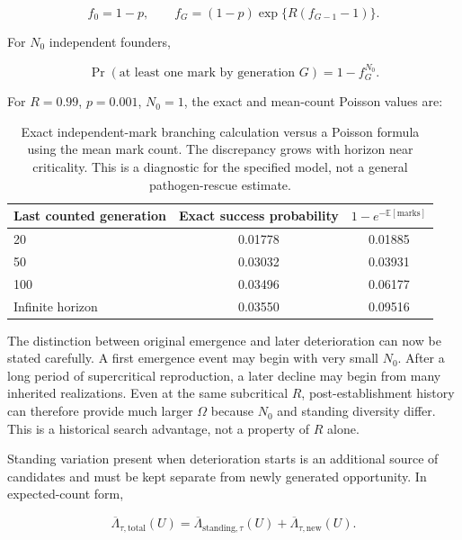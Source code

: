 \documentclass[11pt,a4paper]{article}
\begin{document}
\begin{equation}
f_0=1-p,
\qquad
f_G=(1-p)\exp\{R(f_{G-1}-1)\}.
\label{eq:finite-mark-recursion}
\end{equation}

For $N_0$ independent founders,

\begin{equation}
\Pr(\text{at least one mark by generation }G)
=1-f_G^{N_0}.
\label{eq:finite-mark-prob}
\end{equation}

For $R=0.99$, $p=0.001$, $N_0=1$, the exact and mean-count Poisson values are:

\begin{table}[htbp]
\centering
\begin{tabular}{lcc}
\toprule
Last counted generation & Exact success probability & $1-e^{-\mathbb E[\text{marks}]}$ \\
\midrule
20 & 0.01778 & 0.01885 \\
50 & 0.03032 & 0.03931 \\
100 & 0.03496 & 0.06177 \\
Infinite horizon & 0.03550 & 0.09516 \\
\bottomrule
\end{tabular}
\caption{Exact independent-mark branching calculation versus a Poisson formula using the mean mark count. The discrepancy grows with horizon near criticality. This is a diagnostic for the specified model, not a general pathogen-rescue estimate.}
\label{tab:branching-marks}
\end{table}

The distinction between original emergence and later deterioration can now be stated carefully. A first emergence event may begin with very small $N_0$. After a long period of supercritical reproduction, a later decline may begin from many inherited realizations. Even at the same subcritical $R$, post-establishment history can therefore provide much larger $\Omega$ because $N_0$ and standing diversity differ. This is a historical search advantage, not a property of $R$ alone.

Standing variation present when deterioration starts is an additional source of candidates and must be kept separate from newly generated opportunity. In expected-count form,

\begin{equation}
\overline\Lambda_{\tau,\mathrm{total}}(U)
=
\overline\Lambda_{\mathrm{standing},\tau}(U)
+
\overline\Lambda_{\tau,\mathrm{new}}(U).
\label{eq:standing-plus-new}
\end{equation}
\end{document}
